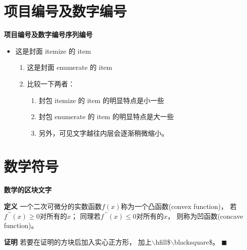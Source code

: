 \documentclass[12pt, aspectratio=169]{beamer}
\begin{document}
\section{项目编号及数字编号}

\linespread{1} 
\begin{frame}[<+>]{\textbf{项目编号及数字编号序列编号}}
\linespread{1.5} 

	\begin{itemize}[]
		\item 这是封面 itemize 的 item
		\begin{enumerate}[] 
			\item 这是封面 enumerate 的 item
			\item 比较一下两者：
				\begin{enumerate}[1] 
					\item 封包 itemize 的 item 的明显特点是小一些
					\item 封包 enumerate 的 item 的明显特点是大一些
					\item 另外，可见文字越往内层会逐渐稍微缩小。
				\end{enumerate}
		\end{enumerate}
	\end{itemize}
	
\end{frame}

\section{数学符号}
\linespread{1} 
\begin{frame}{\textbf{数学的区块文字}}
\linespread{1.5}

	\begin{block}{\textbf{定义}} 
		一个二次可微分的实数函数$f\left(x\right)$称为一个凸函数(convex function)，
		若$f^{\,\prime\prime}\!\left(x\right)\ge0$对所有的$x$；
		同理若$f^{\,\prime\prime}\!\left(x\right)\le0$对所有的$x$，
		则称为凹函数(concave function)。
	\end{block}
	
	\begin{block}{\textbf{证明}} 
		若要在证明的方块后加入实心正方形，
		加上$\backslash$hfill\$$\backslash$blacksquare\$。
		\hfill$\blacksquare$
	\end{block}
	
\end{frame}
\end{document}
